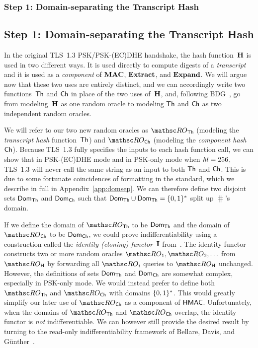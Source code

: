 \def\StepOneTitle{Step 1: Domain-separating the Transcript Hash}
\iffull
	\subsubsection{\StepOneTitle}
\else
	\subsection{\StepOneTitle}
\fi
\label{sec:domsep}
In the original TLS~1.3 PSK/PSK-(EC)DHE handshake, the hash function~$\mathbf{H}$ is used in two different ways.
It is used directly to compute digests of a \emph{transcript} and it is used as a \emph{component} of $\mathbf{MAC}$, $\mathbf{Extract}$, and $\mathbf{Expand}$.
We will argue now that these two uses are entirely distinct, and we can accordingly write two functions~$\mathsf{Th}$ and $\mathsf{Ch}$ in place of the two uses of~$\mathbf{H}$,
and, following BDG~\cite{EC:BelDavGun20}, go from modeling~$\mathbf{H}$ as one random oracle to modeling $\mathsf{Th}$ and $\mathsf{Ch}$ as two independent random oracles.

We will refer to our two new random oracles as $\ROthash$ (modeling the \emph{transcript hash} function~$\mathsf{Th}$) and $\ROchash$ (modeling the \emph{component hash} $\mathsf{Ch}$).
Because TLS~1.3 fully specifies the inputs to each hash function call,
we can show that in PSK-(EC)DHE mode and in PSK-only mode when $\mathit{hl}=256$, TLS~1.3 will never call the same string as an input to both $\mathsf{Th}$ and $\mathsf{Ch}$. 
This is due to some fortunate coincidences of formatting in the standard, which we describe in full in Appendix~\ref{app:domsep}. 
We can therefore define two disjoint sets $\mathsf{Dom}_{\mathsf{Th}}$ and $\mathsf{Dom}_{\mathsf{Ch}}$ such that $\mathsf{Dom}_{\mathsf{Th}} \cup \mathsf{Dom}_{\mathsf{Th}} = \{0,1\}^*$ split up $\hash$'s domain. 

If we define the domain of $\ROthash$ to be $\mathsf{Dom}_{\mathsf{Th}}$ and the domain of $\ROchash$ to be $\mathsf{Dom}_{\mathsf{Ch}}$, we could prove indifferentiability using a construction called the \emph{identity (cloning) functor}~$\mathbf{I}$ from~\cite{EC:BelDavGun20}.
The identity functor constructs two or more random oracles $\RO_1, \RO_2,\ldots$ from $\ROhash$ by forwarding all $\RO_i$ queries to $\ROhash$ unchanged.
However, the definitions of sets $\mathsf{Dom}_{\mathsf{Th}}$ and $\mathsf{Dom}_{\mathsf{Ch}}$ are somewhat complex, especially in PSK-only mode.
We would instead prefer to define both $\ROthash$ and $\ROchash$ with domains $\{0,1\}^*$.
This would greatly simplify our later use of $\ROchash$ as a component of $\mathsf{HMAC}$.
Unfortunately, when the domains of $\ROthash$ and $\ROchash$ overlap, the identity functor is \emph{not} indifferentiable.
We can however still provide the desired result by turning to the read-only indifferentiability framework of Bellare, Davis, and Günther~\cite{EC:BelDavGun20}.

